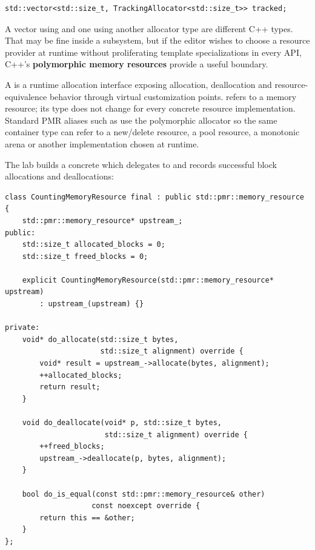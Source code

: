 \begin{verbatim}
std::vector<std::size_t, TrackingAllocator<std::size_t>> tracked;
\end{verbatim}

A vector using  and one using another allocator type are different C++ types. That may be fine inside a subsystem, but if the editor wishes to choose a resource provider at runtime without proliferating template specializations in every API, C++'s \textbf{polymorphic memory resources} provide a useful boundary.

A  is a runtime allocation interface exposing allocation, deallocation and resource-equivalence behavior through virtual customization points.  refers to a memory resource; its type does not change for every concrete resource implementation. Standard PMR aliases such as  use the polymorphic allocator so the same container type can refer to a new/delete resource, a pool resource, a monotonic arena or another implementation chosen at runtime.

The lab builds a concrete  which delegates to  and records successful block allocations and deallocations:

\begin{verbatim}
class CountingMemoryResource final : public std::pmr::memory_resource {
    std::pmr::memory_resource* upstream_;
public:
    std::size_t allocated_blocks = 0;
    std::size_t freed_blocks = 0;

    explicit CountingMemoryResource(std::pmr::memory_resource* upstream)
        : upstream_(upstream) {}

private:
    void* do_allocate(std::size_t bytes,
                      std::size_t alignment) override {
        void* result = upstream_->allocate(bytes, alignment);
        ++allocated_blocks;
        return result;
    }

    void do_deallocate(void* p, std::size_t bytes,
                       std::size_t alignment) override {
        ++freed_blocks;
        upstream_->deallocate(p, bytes, alignment);
    }

    bool do_is_equal(const std::pmr::memory_resource& other)
                    const noexcept override {
        return this == &other;
    }
};
\end{verbatim}

